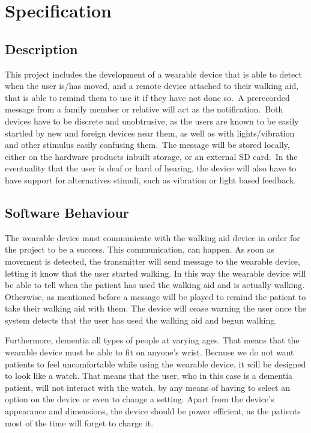 \chapter{Specification}\label{ch:specification}
    \section{Description}

        This project includes the development of a wearable device that is able to detect when the user is/has moved,
        and a remote device attached to their walking aid, that is able to remind them to use it if they have not done
        so.\ A prerecorded message from a family member or relative will act as the notification.\ Both devices have to
        be discrete and unobtrusive, as the users are known to be easily startled by new and foreign devices near them,
        as well as with lights/vibration and other stimulus easily confusing them.\ The message will be stored locally,
        either on the hardware products inbuilt storage, or an external SD card.\ In the eventuality that the user
        is deaf or hard of hearing, the device will also have to have support for alternatives stimuli, such as vibration or light based feedback.

    \section{Software Behaviour}

        The wearable device must communicate with the walking aid device in order for the project to be a success. This
        communication, can happen. As soon as movement is detected, the transmitter will
        send message to the wearable device, letting it know that the user started walking. In this way the wearable
        device will be able to tell when the patient has used the walking aid and is actually walking. Otherwise, as
        mentioned before a message will be played to remind the patient to take their walking aid with them. The device
        will cease warning the user once the system detects that the user has used the walking aid and begun walking.

        Furthermore, dementia all types of people at varying ages. That means that the wearable device must be able to
        fit on anyone's wrist. Because we do not want patients to feel uncomfortable while using the wearable device, it
        will be designed to look like a watch. That means that the user, who in this case is a dementia patient, will
        not interact with the watch, by any means of having to select an option on the device or even to change a
        setting. Apart from the device's appearance and dimensions, the device should be power efficient, as the
        patients most of the time will forget to charge it.


